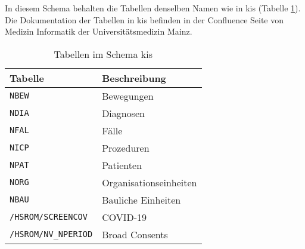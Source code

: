  In diesem Schema behalten die Tabellen denselben Namen wie in \ac{kis} (Tabelle \ref{tab:schemaKis}). Die Dokumentation der Tabellen in \ac{kis} befinden in der Confluence Seite von Medizin Informatik der Universitätsmedizin Mainz.
 
 \begin{table}[ht]
 	\centering   
 	\caption{Tabellen im Schema \acs{kis}}
 	\label{tab:schemaKis}
 	\begin{tabular}{||l|l||}   		
 		\hline
 		Tabelle & Beschreibung \\ [0.5ex]
 		\hline\hline
 		\texttt{NBEW} & Bewegungen \\
 		\hline
 		\texttt{NDIA} & Diagnosen \\
 		\hline
 		\texttt{NFAL} & Fälle \\
 		\hline
 		\texttt{NICP} & Prozeduren \\
 		\hline
 		\texttt{NPAT} & Patienten \\
 		\hline
 		\texttt{NORG} & Organisationseinheiten \\
 		\hline
 		\texttt{NBAU} & Bauliche Einheiten \\
 		\hline
 		\texttt{/HSROM/SCREENCOV} & COVID-19 \\
 		\hline
 		\texttt{/HSROM/NV\_NPERIOD} & Broad Consents \\
 		\hline
 	\end{tabular}
 \end{table}